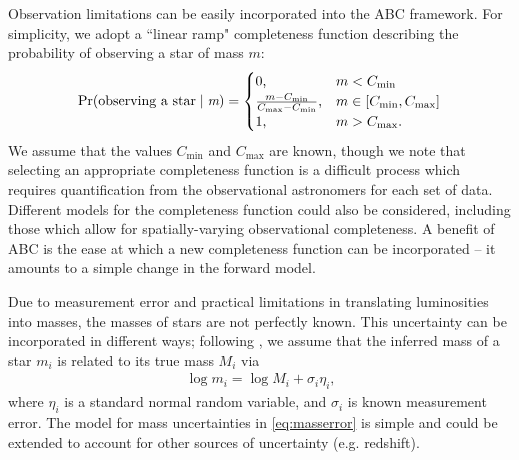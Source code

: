 \documentclass[ejs]{imsart}
\numberwithin{equation}{section}
\theoremstyle{plain}
\newcommand{\Proba}{\rm{Pr}}
\newcommand{\Cmin}{C_{\text{min}}}
\newcommand{\Cmax}{C_{\text{max}}}
\begin{document}
Observation limitations can be easily incorporated into the ABC framework.  For simplicity, we adopt a ``linear ramp" completeness function describing the probability of observing a star of mass $m$:
\begin{align}
	\Proba(\text{observing a star} \mid \emph{m}) = \begin{cases} 0 \text{,} & m < \Cmin\\
								\frac{m - \Cmin}{\Cmax - \Cmin}\text{,} & m \in [\Cmin, \Cmax] \\
								1 \text{,} & m > \Cmax \text{.}
								\end{cases} \label{eq:ramp}
\end{align}
We assume that the values $\Cmin$ and $\Cmax$ are known, though we note that selecting an appropriate completeness function is a difficult process which requires quantification from the observational astronomers for each set of data.
Different models for the completeness function could also be considered, including those which allow for spatially-varying observational completeness.  A benefit of ABC is the ease at which a new completeness function can be incorporated -- it amounts to a simple change in the forward model.  

Due to measurement error and practical limitations in translating luminosities into masses, the masses of stars are not perfectly known. 
This uncertainty can be incorporated in different ways; following \cite{weisz13}, we assume that the inferred mass of a star $m_i$ is related to its true mass $M_i$ via 
\begin{align}
	\log m_i = \log M_i + \sigma_i \eta_i \text{,}
	\label{eq:masserror}
\end{align}
where $\eta_i$ is a standard normal random variable, and $\sigma_i$ is known measurement error.   %
The model for mass uncertainties in \eqref{eq:masserror} is simple and could be extended to account for other sources of uncertainty (e.g. redshift).
\end{document}
